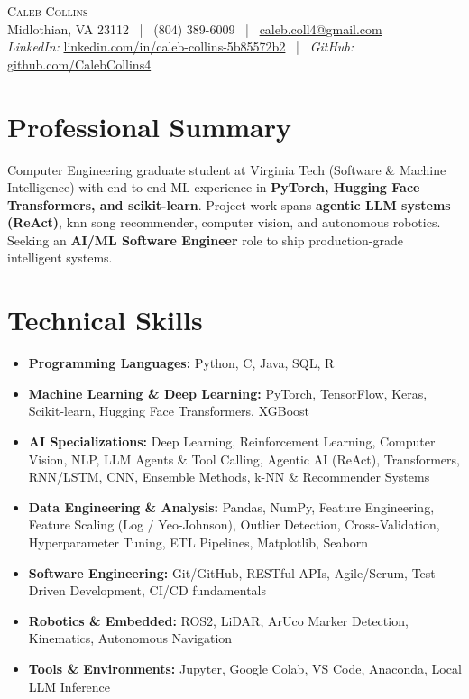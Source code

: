 \documentclass[letterpaper,10pt]{article}
\begin{document}
\begin{center}
    {\LARGE \scshape Caleb Collins} \\ \vspace{2pt}
    \small Midlothian, VA 23112 ~|~ (804) 389-6009 ~|~
    \href{mailto:caleb.coll4@gmail.com}{caleb.coll4@gmail.com} \\
    \small \textit{LinkedIn:} \href{https://www.linkedin.com/in/caleb-collins-5b85572b2}{linkedin.com/in/caleb-collins-5b85572b2} ~|~ \textit{GitHub:} \href{https://github.com/CalebCollins4}{github.com/CalebCollins4}
\end{center}

\section{Professional Summary}
\small Computer Engineering graduate student at Virginia Tech (Software \& Machine Intelligence) with end-to-end ML experience in \textbf{PyTorch, Hugging Face Transformers, and scikit-learn}. Project work spans \textbf{agentic LLM systems (ReAct)}, knn song recommender, computer vision, and autonomous robotics. Seeking an \textbf{AI/ML Software Engineer} role to ship production-grade intelligent systems.

\section{Technical Skills}
\small
\begin{itemize}[leftmargin=0.15in, itemsep=0pt, parsep=0pt, topsep=1pt, label={}]
    \item \textbf{Programming Languages:} Python, C, Java, SQL, R
    \item \textbf{Machine Learning \& Deep Learning:} PyTorch, TensorFlow, Keras, Scikit-learn, Hugging Face Transformers, XGBoost
    \item \textbf{AI Specializations:} Deep Learning, Reinforcement Learning, Computer Vision, NLP, LLM Agents \& Tool Calling, Agentic AI (ReAct), Transformers, RNN/LSTM, CNN, Ensemble Methods, k-NN \& Recommender Systems
    \item \textbf{Data Engineering \& Analysis:} Pandas, NumPy, Feature Engineering, Feature Scaling (Log / Yeo-Johnson), Outlier Detection, Cross-Validation, Hyperparameter Tuning, ETL Pipelines, Matplotlib, Seaborn
    \item \textbf{Software Engineering:} Git/GitHub, RESTful APIs, Agile/Scrum, Test-Driven Development, CI/CD fundamentals
    \item \textbf{Robotics \& Embedded:} ROS2, LiDAR, ArUco Marker Detection, Kinematics, Autonomous Navigation
    \item \textbf{Tools \& Environments:} Jupyter, Google Colab, VS Code, Anaconda, Local LLM Inference
\end{itemize}
\end{document}
